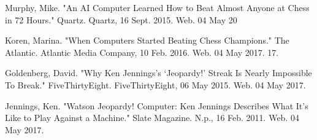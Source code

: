 \documentclass[10pt, a4paper, twocolumn]{article} %
\begin{document}
\printbibliography[title={Bibliography}] %

Murphy, Mike. "An AI Computer Learned How to Beat Almost Anyone at Chess in 72 Hours." Quartz. Quartz, 16 Sept. 2015. Web. 04 May 20

Koren, Marina. "When Computers Started Beating Chess Champions." The Atlantic. Atlantic Media Company, 10 Feb. 2016. Web. 04 May 2017. 
17.

Goldenberg, David. "Why Ken Jennings’s ‘Jeopardy!’ Streak Is Nearly Impossible To Break." FiveThirtyEight. FiveThirtyEight, 06 May 2015. Web. 04 May 2017. 

Jennings, Ken. "Watson Jeopardy! Computer: Ken Jennings Describes What It’s Like to Play Against a Machine." Slate Magazine. N.p., 16 Feb. 2011. Web. 04 May 2017. 

\end{document}
